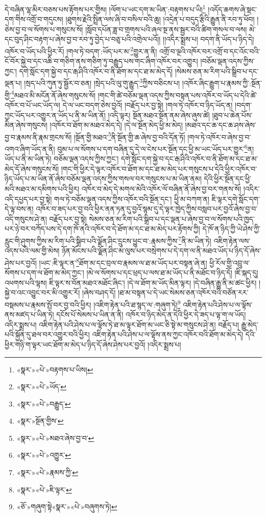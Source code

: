 དེ་བཞིན་ལྷ་མིར་བཅས་པས་རྟོགས་པར་གྱིས། །ལོག་པ་ཡང་དག་མ་ཡིན་:བརྟགས་པ་ཡི།\footnote{«སྣར་»«པེ་»བརྟགས་པ་ཡིས།} །འདོད་ཆགས་ཞེ་སྡང་དག་གིས་འགྲོ་བ་གདུངས། །ཐུགས་རྗེའི་སྤྲིན་ལས་ཞི་བ་བསིལ་བའི་ཆུ། །འདྲེན་པ་བདུད་རྩིའི་རྒྱུན་ནི་རབ་ཏུ་ཕོབ། །ཅེས་བྱ་བ་ལ་སོགས་པ་གསུངས་སོ། །སློབ་དཔོན་ཟླ་བ་གྲགས་པའི་ཞལ་སྔ་ནས་སྦྱར་བའི་ཚིག་གསལ་བ་ལས། མེ་དང་བུད་ཤིང་བརྟག་པ་ཞེས་བྱ་བ་རབ་ཏུ་བྱེད་པ་བཅུ་པའི་འགྲེལ་པའོ།། །།འདིར་སྨྲས་པ། བདག་ནི་ཡོད་པ་ཉིད་དེ། འཁོར་བ་ཡོད་པའི་ཕྱིར་རོ། །གལ་ཏེ་བདག་:ཡོད་པར་མ་\footnote{«སྣར་»«པེ་»ཡོད་}གྱུར་ན་ནི། འགྲོ་བ་ལྔའི་འཁོར་བར་འགྲོ་བ་དང་འོང་བའི་ངོ་བོར་སྐྱེ་བ་དང་འཆི་བ་གཅིག་ནས་གཅིག་ཏུ་བརྒྱུད་པས་གང་ཞིག་འཁོར་བར་འགྱུར། །བཅོམ་ལྡན་འདས་ཀྱིས་ཀྱང་། དགེ་སློང་དག་སྐྱེ་བ་དང་རྒ་ཤིའི་འཁོར་བ་ནི་ཐོག་མ་དང་ཐ་མ་མེད་དོ། །སེམས་ཅན་མ་རིག་པའི་སྒྲིབ་པ་དང་ལྡན་པ། །སྲད་པའི་ཀུན་ཏུ་སྦྱོར་བ་ཅན། །སྲེད་པའི་ལུ་གུ་རྒྱུད་\footnote{«སྣར་»«པེ་»བརྒྱུད་}ཀྱིས་བཅིངས་པ། །འཁོར་ཞིང་རྒྱུག་པ་རྣམས་ཀྱི་:སྔོན་གྱི་\footnote{«སྣར་»སྔོན་གྱིས་}མཐའ་མི་མངོན་ནོ་ཞེས་གསུངས་སོ། །གང་གི་ཚེ་བཅོམ་ལྡན་འདས་ཀྱིས་བསྟན་པས་འཁོར་བ་ཡོད་པ་དེའི་ཚེ་འཁོར་བ་པོ་ཡང་ཡོད་ལ། དེ་ལ་ཡང་བདག་ཅེས་བྱའོ། །བརྗོད་པར་བྱ་སྟེ། །གལ་ཏེ་འཁོར་བ་ཉིད་ཡོད་ན། །བདག་ཀྱང་ཡོད་པར་འགྱུར་ན་ཡོད་པ་ནི་མ་ཡིན་ནོ། །འདི་ལྟར། སྔོན་མཐའ་སྔོན་ནམ་ཞེས་ཞུས་ཚེ། །ཐུབ་པ་ཆེན་པོས་མིན་ཞེས་གསུངས། །འཁོར་བ་ཐོག་མ་མཐའ་མེད་དེ། །དེ་ལ་སྔོན་མེད་ཕྱི་མ་མེད། །མཐའ་དང་ཆ་དང་ཆ་ཤས་ཞེས་བྱ་བ་རྣམས་ནི་རྣམ་གྲངས་སོ། །སྔོན་གྱི་མཐའ་\footnote{«སྣར་»«པེ་»མཐའ་ཞེས་བྱ་བ་}ནི་སྔོན་གྱི་ཆ་ཞེས་བྱ་བའི་དོན་ཏོ། །གལ་ཏེ་འཁོར་བ་ཞེས་བྱ་བ་འགའ་ཞིག་ཡོད་ན་ནི། བུམ་པ་ལ་སོགས་པ་དག་བཞིན་དུ་དེ་ལ་ངེས་པར་སྔོན་དང་ཕྱི་མ་ཡང་ཡོད་པར་གྱུར་\footnote{«སྣར་»«པེ་»འགྱུར་}ན། ཡོད་པ་ནི་མ་ཡིན་ཏེ། བཅོམ་ལྡན་འདས་ཀྱིས་ཀྱང་། དགེ་སློང་དག་སྐྱེ་བ་དང་རྒ་ཤིའི་འཁོར་བ་ནི་ཐོག་མ་དང་ཐ་མ་མེད་དོ་ཞེས་གསུངས་སོ། །གང་གི་ཕྱིར་དེ་ལྟར་འཁོར་བ་ཐོག་མ་དང་ཐ་མ་མེད་པར་གསུངས་པ་དེའི་ཕྱིར་འཁོར་བ་ཉིད་ཡོད་པ་མ་ཡིན་ནོ་ཞེས་བཅོམ་ལྡན་འདས་ཀྱིས་གསལ་བར་གསུངས་པ་མ་ཡིན་ནམ། དེའི་ཕྱིར་སྔོན་དང་ཕྱི་མའི་མཐའ་མ་དམིགས་པའི་ཕྱིར། འཁོར་བ་མེད་དེ་མགལ་མེའི་འཁོར་ལོ་བཞིན་ནོ་ཞེས་བྱ་བར་གནས་སོ། །འདིར་འདི་དཔྱད་པར་བྱ་སྟེ། གལ་ཏེ་བཅོམ་ལྡན་འདས་ཀྱིས་འཁོར་བའི་སྔོན་དང་། ཕྱི་མ་བཀག་ན། ཇི་ལྟར་དགེ་སློང་དག་དེ་ལྟ་བས་ན། འཁོར་བ་ཟད་པར་བྱ་བའི་ཕྱིར་ནན་ཏན་དུ་བྱའོ་སྙམ་དུ་དེ་ལྟར་ཁྱེད་ཀྱིས་བསླབ་པར་བྱའོ་ཞེས་བྱ་བ་འདི་གསུངས་ཤེ་ན། བརྗོད་པར་བྱ་སྟེ། སེམས་ཅན་མ་རིག་པའི་སྒྲིབ་པ་དང་ལྡན་པ་ཞེས་བྱ་བ་ལ་སོགས་པའི་ཁྱད་པར་ཉེ་བར་བཀོད་པས་དེ་དག་ཁོ་ནའི་འཁོར་བ་དེ་ཐོག་མ་དང་ཐ་མ་མེད་པར་རྟོགས་ཀྱི། དེ་ཁོ་ན་ཉིད་ཀྱི་ཡེ་ཤེས་ཀྱི་རླུང་གི་ཤུགས་ཀྱིས་མ་རིག་པའི་སྒྲིབ་པའི་ལྗོན་ཤིང་དྲུངས་ཕྱུང་བ་:རྣམས་ཀྱིས་\footnote{«སྣར་»«པེ་»རྣམས་ཀྱི་}ནི་མ་ཡིན་ཏེ། འཇིག་རྟེན་ལས་འདས་པའི་ལམ་གྱི་མེས། ཉོན་མོངས་པའི་ལྗོན་ཤིང་མ་ལུས་པར་བསྲེགས་པ་དེ་དག་ལ་ནི་མཐའ་ཡོད་པ་ཉིད་དོ་ཞེས་ཤེས་པར་བྱའོ། །ཡང་:ཇི་ལྟར་ན་\footnote{«སྣར་»«པེ་»ཇི་ལྟར་}ཐོག་མ་དང་བྲལ་བ་རྣམས་ལ་ཐ་མ་ཡོད་པར་བསྟན་ཞེ་ན། ཕྱི་རོལ་གྱི་འབྲུ་ལ་སོགས་པ་དག་ལ་ཐོག་མ་མེད་ཀྱང་། །མེ་ལ་སོགས་པ་དང་ཕྲད་པ་ལས་ཐ་མ་ཡོད་པ་ནི་མཐོང་བ་ཉིད་དོ། །ཇི་སྐད་དུ། འཕགས་པའི་ལྷས། ཇི་ལྟར་ས་བོན་མཐའ་མཐོང་ཞིང་། །དེ་ལ་ཐོག་མ་ཡོད་མིན་ལྟར། །དེ་བཞིན་རྒྱུ་ནི་མ་ཚང་ཕྱིར། །སྐྱེ་བ་འང་འབྱུང་བར་མི་འགྱུར་རོ། །ཞེས་བཤད་དོ། །ཐ་མ་བསྟན་པ་དེ་ཡང་སེམས་ཅན་འཁོར་བའི་བཙོན་རར་བསྡམས་པ་རྣམས་སྤོ་བར་བྱ་བའི་ཕྱིར། །འཇིག་རྟེན་པའི་ཐ་སྙད་ལ་:གཞུག་ཏེ།\footnote{«ཅོ་»གཞུག་སྟེ«སྣར་»«པེ་»བཞུགས་ཏེ།} འཇིག་རྟེན་པའི་ཤེས་པ་ལ་ལྟོས་ནས་མཛད་པ་ཡིན་ཏེ། དངོས་པོ་སེམས་པ་ཡིན་ན་ནི། འཁོར་བ་ཉིད་མེད་ན་དེའི་ཕྱིར་དེ་ཟད་པ་ལྟ་ག་ལ་ཡོད། འདིར་སྨྲས་པ། འཇིག་རྟེན་པའི་ཤེས་པ་ལ་ལྟོས་ཏེ་ཐ་མ་ལྟར་ཐོག་མ་ཡང་ཅི་སྟེ་མ་གསུངས་ཤེ་ན། བརྗོད་པ། རྒྱུ་མེད་པའི་སྐྱོན་དུ་ཐལ་བར་འགྱུར་བའི་ཕྱིར། འཇིག་རྟེན་པའི་ཤེས་པ་ལ་ལྟོས་ནས་ཀྱང་འཁོར་བའི་ཐོག་མ་མེད་དེ། དེའི་ཕྱིར་གཉི་ག་ལྟར་ཡང་ཐོག་མ་མེད་པ་ཉིད་དོ་ཞེས་ཤེས་པར་བྱའོ། །འདིར་སྨྲས་པ། 